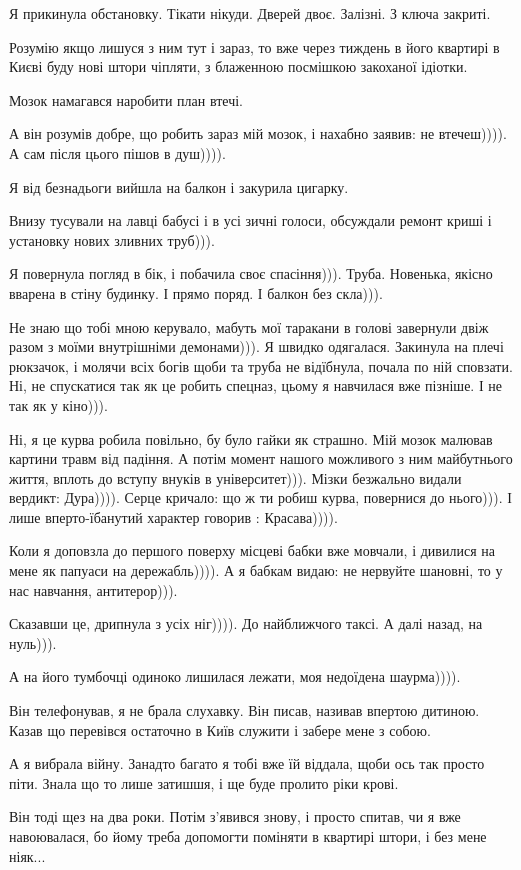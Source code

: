 Я прикинула обстановку. Тікати нікуди. Дверей двоє. Залізні. З ключа закриті.

Розумію якщо лишуся з ним тут і зараз, то вже через тиждень в його квартирі в
Києві буду нові штори чіпляти, з блаженною посмішкою закоханої ідіотки.

Мозок намагався наробити план втечі. 

А він розумів добре, що робить зараз мій мозок, і нахабно заявив: не
втечеш)))). А сам після цього пішов в душ)))).

Я від безнадьоги вийшла на балкон і закурила цигарку.

Внизу тусували на лавці бабусі і в усі зичні голоси, обсуждали ремонт криші і
установку нових зливних труб))).

Я повернула погляд в бік, і побачила своє спасіння))). Труба. Новенька, якісно
вварена в стіну будинку. І прямо поряд. І балкон без скла))).

Не знаю що тобі мною керувало, мабуть мої таракани в голові завернули двіж
разом з моїми внутрішніми демонами))). Я швидко одягалася. Закинула на плечі
рюкзачок, і молячи всіх богів щоби та труба не відїбнула, почала по ній
сповзати. Ні, не спускатися так як це робить спецназ, цьому я навчилася вже
пізніше. І не так як у кіно))).

Ні, я це курва робила повільно, бу було гайки як страшно. Мій мозок малював
картини травм від падіння. А потім момент нашого можливого з ним майбутнього
життя, вплоть до вступу внуків в університет))). Мізки безжально видали
вердикт: Дура)))). Серце кричало: що ж ти робиш курва, повернися до нього))). І
лише вперто-їбанутий характер говорив : Красава)))). 

Коли я доповзла до першого поверху місцеві бабки вже мовчали, і дивилися на
мене як папуаси на дережабль)))). А я бабкам видаю: не нервуйте шановні, то у
нас навчання, антитерор))).

Сказавши це, дрипнула з усіх ніг)))). До найближчого таксі. А далі назад, на
нуль))).

А на його тумбочці одиноко лишилася лежати, моя недоїдена шаурма)))).

Він телефонував, я не брала слухавку. Він писав, називав впертою дитиною. Казав
що перевівся остаточно в Київ служити і забере мене з собою.

А я вибрала війну. Занадто багато я тобі вже їй віддала, щоби ось так просто
піти. Знала що то лише затишшя, і ще буде пролито ріки крові.

Він тоді щез на два роки. Потім з'явився знову, і просто спитав, чи я вже
навоювалася, бо йому треба допомогти поміняти в квартирі штори, і без мене
ніяк...

